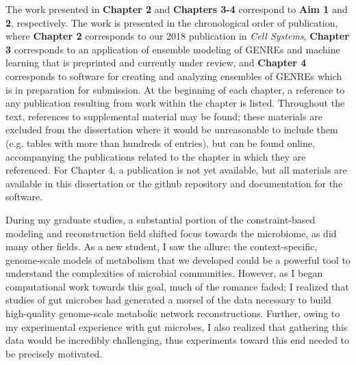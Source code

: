 \documentclass[11pt,twocolumn,notitlepage,openany,twoside]{book}
\begin{document}
\begin{refsection}
The work presented in \textbf{Chapter 2} and \textbf{Chapters 3-4} correspond to \textbf{Aim 1} and \textbf{2}, respectively. The work is presented in the chronological order of publication, where \textbf{Chapter 2} corresponds to our 2018 publication in \textit{Cell Systems}, \textbf{Chapter 3} corresponds to an application of ensemble modeling of GENREs and machine learning that is preprinted and currently under review, and \textbf{Chapter 4} corresponds to software for creating and analyzing ensembles of GENREs which is in preparation for submission. At the beginning of each chapter, a reference to any publication resulting from work within the chapter is listed. Throughout the text, references to supplemental material may be found; these materials are excluded from the dissertation where it would be unreasonable to include them (e.g. tables with more than hundreds of entries), but can be found online, accompanying the publications related to the chapter in which they are referenced. For Chapter 4, a publication is not yet available, but all materials are available in this dissertation or the github repository and documentation for the software.

During my graduate studies, a substantial portion of the constraint-based modeling and reconstruction field shifted focus towards the microbiome, as did many other fields. As a new student, I saw the allure: the context-specific, genome-scale models of metabolism that we developed could be a powerful tool to understand the complexities of microbial communities. However, as I began computational work towards this goal, much of the romance faded; I realized that studies of gut microbes had generated a morsel of the data necessary to build high-quality genome-scale metabolic network reconstructions. Further, owing to my experimental experience with gut microbes, I also realized that gathering this data would be incredibly challenging, thus experiments toward this end needed to be precisely motivated.


\end{refsection}
\end{document}
